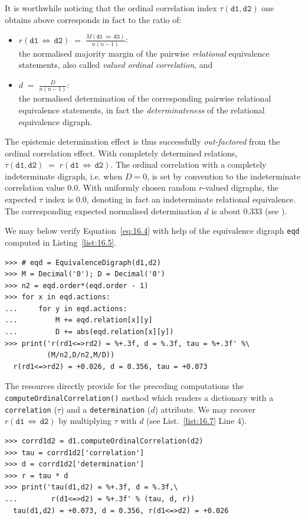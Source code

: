 It is worthwhile noticing that the ordinal correlation index $\tau(\mathtt{d1},\mathtt{d2})$ one obtains above corresponds in fact to the ratio of:
\begin{itemize}
\item $r(\mathtt{d1}\,\Leftrightarrow\, \mathtt{d2}) \;=\; \frac{M(\mathtt{d1}\,\Leftrightarrow\, \mathtt{d2})}{n(n-1)}$:\\the normalised majority margin of the pairwise \emph{relational} equivalence statements, also called \emph{valued ordinal correlation}, and 
\item $d \;=\; \frac{D}{n(n-1)}$:\\ the normalised determination of the corresponding pairwise relational equivalence statements, in fact the \emph{determinateness} of the relational equivalence digraph.
\end{itemize}

The epistemic determination effect is thus successfully \emph{out-factored} from the ordinal correlation effect. With completely determined relations, $\tau(\mathtt{d1},\mathtt{d2}) \;=\; r(\mathtt{d1}\,\Leftrightarrow\, \mathtt{d2})$. The ordinal correlation with a completely indeterminate digraph, i.e. when $D = 0$, is set by convention to the indeterminate correlation value $0.0$. With uniformly chosen random $r$-valued digraphs, the expected $\tau$ index is $0.0$, denoting in fact an indeterminate relational equivalence. The corresponding expected normalised determination $d$ is about $0.333$ (see \citep{BIS-2012a}).

We may below verify Equation~\vref{eq:16.4} with help of the equivalence digraph \texttt{eqd} computed in Listing~\vref{list:16.5}.
\begin{lstlisting}[caption={Computing the ordinal correlation index from the equivalence digraph},label=list:16.6]
>>> # eqd = EquivalenceDigraph(d1,d2)
>>> M = Decimal('0'); D = Decimal('0')
>>> n2 = eqd.order*(eqd.order - 1)
>>> for x in eqd.actions:
...     for y in eqd.actions:
...         M += eqd.relation[x][y]
...         D += abs(eqd.relation[x][y])
>>> print('r(rd1<=>rd2) = %+.3f, d = %.3f, tau = %+.3f' %\
          (M/n2,D/n2,M/D))   
  r(rd1<=>rd2) = +0.026, d = 0.356, tau = +0.073  
\end{lstlisting}

The \Digraph resources directly provide for the preceding computations the \texttt{compute\-OrdinalCorrelation()} method which renders a dictionary with a \texttt{correlation} ($\tau$) and a \texttt{determina\-tion} ($d$) attribute. We may recover $r(\mathtt{d1}\,\Leftrightarrow\, \mathtt{d2})$ by multiplying $\tau$ with $d$ (see List.~\vref{list:16.7} Line 4). 
\begin{lstlisting}[caption={Computing the valued ordinal correlation index},label=list:16.7]
>>> corrd1d2 = d1.computeOrdinalCorrelation(d2)
>>> tau = corrd1d2['correlation']
>>> d = corrd1d2['determination']
>>> r = tau * d
>>> print('tau(d1,d2) = %+.3f, d = %.3f,\
...        r(d1<=>d2) = %+.3f' % (tau, d, r))
  tau(d1,d2) = +0.073, d = 0.356, r(d1<=>d2) = +0.026
\end{lstlisting}


